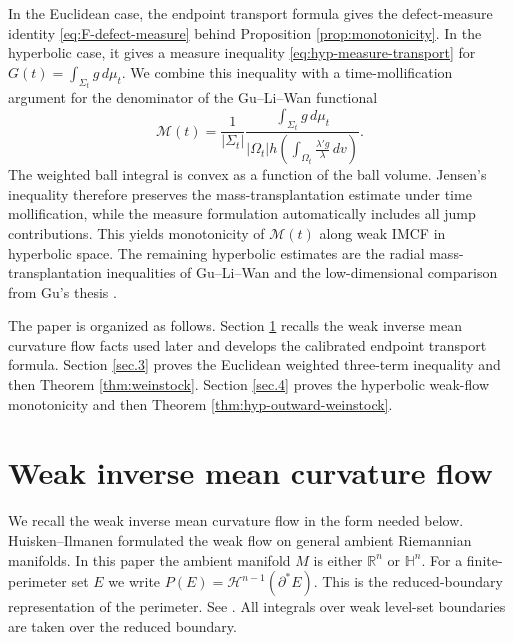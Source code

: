 \documentclass[10pt,a4paper]{amsart}
\numberwithin{equation}{section}
\newcommand{\R}{\mathbb R}
\newcommand{\calH}{\mathcal H}
\newcommand{\HH}{\mathbb H}
\begin{document}
In the Euclidean case, the endpoint transport formula gives the defect-measure identity \eqref{eq:F-defect-measure} behind Proposition \ref{prop:monotonicity}.  In the hyperbolic case, it gives a measure inequality \eqref{eq:hyp-measure-transport} for $G(t)=\int_{\Sigma_t}g\,d\mu_t$.  We combine this inequality with a time-mollification argument for the denominator of the Gu--Li--Wan \cite{GuLiWan2025} functional
\begin{equation}\label{s1.Mt}
    \mathcal M(t)=\frac{1}{|\Sigma_t|}
    \frac{\int_{\Sigma_t}g\,d\mu_t}
        {|\Omega_t|h(\int_{\Omega_t}\frac{\lambda'g}{\lambda}\,dv)}.
\end{equation}
The weighted ball integral is convex as a function of the ball volume. Jensen's inequality therefore preserves the mass-transplantation estimate under time mollification, while the
measure formulation automatically includes all jump contributions. This yields monotonicity of $ \mathcal M(t)$ along weak IMCF in hyperbolic space. The remaining hyperbolic estimates are the radial mass-transplantation inequalities of Gu--Li--Wan \cite{GuLiWan2025} and the low-dimensional comparison from Gu's thesis \cite{GuThesis2026}.


The paper is organized as follows.  Section \ref{sec.2} recalls the weak inverse mean curvature flow facts used later and develops the calibrated endpoint transport formula.  Section \ref{sec.3} proves the Euclidean weighted three-term inequality and then Theorem \ref{thm:weinstock}.  Section \ref{sec.4} proves the hyperbolic weak-flow monotonicity and then Theorem \ref{thm:hyp-outward-weinstock}.

\section{Weak inverse mean curvature flow}\label{sec.2}

We recall the weak inverse mean curvature flow in the form needed below.  Huisken--Ilmanen \cite{HI2001} formulated the weak flow on general ambient Riemannian manifolds.  In this paper the ambient manifold $M$ is either $\R^n$ or $\HH^n$.  For a finite-perimeter set $E$ we write $P(E)=\calH^{n-1}(\partial^*E)$. This is the reduced-boundary representation of the perimeter.  See \cite[Theorem~15.9]{Maggi2012}.  All integrals over weak level-set boundaries are taken over the reduced boundary.
\end{document}
